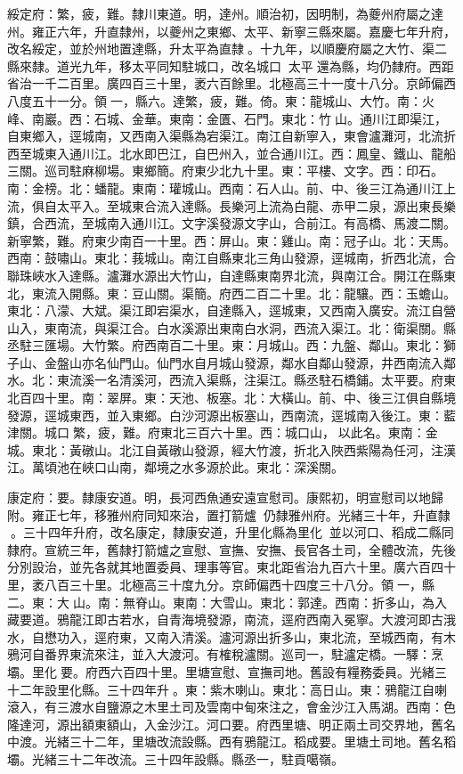 \begin{pinyinscope}
綏定府：繁，疲，難。隸川東道。明，達州。順治初，因明制，為夔州府屬之達州。雍正六年，升直隸州，以夔州之東鄉、太平、新寧三縣來屬。嘉慶七年升府，改名綏定，並於州地置達縣，升太平為直隸。十九年，以順慶府屬之大竹、渠二縣來隸。道光九年，移太平同知駐城口，改名城口，太平還為縣，均仍隸府。西距省治一千二百里。廣四百三十里，袤六百餘里。北極高三十一度十八分。京師偏西八度五十一分。領一，縣六。達繁，疲，難。倚。東：龍城山、大竹。南：火峰、南巖。西：石城、金華。東南：金匱、石門。東北：竹山。通川江即渠江，自東鄉入，逕城南，又西南入渠縣為宕渠江。南江自新寧入，東會瀘灘河，北流折西至城東入通川江。北水即巴江，自巴州入，並合通川江。西：鳳皇、鐵山、龍船三關。巡司駐麻柳場。東鄉簡。府東少北九十里。東：平樓、文字。西：印石。南：金榜。北：蟠龍。東南：瓘城山。西南：石人山。前、中、後三江為通川江上流，俱自太平入。至城東合流入達縣。長樂河上流為白龍、赤甲二泉，源出東長樂鎮，合西流，至城南入通川江。文字溪發源文字山，合前江。有高橋、馬渡二關。新寧繁，難。府東少南百一十里。西：屏山。東：雞山。南：冠子山。北：天馬。西南：鼓嘯山。東北：莪城山。南江自縣東北三角山發源，逕城南，折西北流，合聯珠峽水入達縣。瀘灘水源出大竹山，自達縣東南界北流，與南江合。開江在縣東北，東流入開縣。東：豆山關。渠簡。府西二百二十里。北：龍驤。西：玉蟾山。東北：八濛、大斌。渠江即宕渠水，自達縣入，逕城東，又西南入廣安。流江自營山入，東南流，與渠江合。白水溪源出東南白水洞，西流入渠江。北：衛渠關。縣丞駐三匯場。大竹繁。府西南百二十里。東：月城山。西：九盤、鄰山。東北：獅子山、金盤山亦名仙門山。仙門水自月城山發源，鄰水自鄰山發源，井西南流入鄰水。北：東流溪一名清溪河，西流入渠縣，注渠江。縣丞駐石橋鋪。太平要。府東北百四十里。南：翠屏。東：天池、板塞。北：大橫山。前、中、後三江俱自縣境發源，逕城東西，並入東鄉。白沙河源出板塞山，西南流，逕城南入後江。東：藍津關。城口繁，疲，難。府東北三百六十里。西：城口山，以此名。東南：金城。東北：黃礅山。北江自黃礅山發源，經大竹渡，折北入陜西紫陽為任河，注漢江。萬頃池在峽口山南，鄰境之水多源於此。東北：深溪關。

康定府：要。隸康安道。明，長河西魚通安遠宣慰司。康熙初，明宣慰司以地歸附。雍正七年，移雅州府同知來治，置打箭爐，仍隸雅州府。光緒三十年，升直隸。三十四年升府，改名康定，隸康安道，升里化縣為里化，並以河口、稻成二縣同隸府。宣統三年，舊隸打箭爐之宣慰、宣撫、安撫、長官各土司，全體改流，先後分別設治，並先各就其地置委員、理事等官。東北距省治九百六十里。廣六百四十里，袤八百三十里。北極高三十度九分。京師偏西十四度三十八分。領一，縣二。東：大山。南：無脊山。東南：大雪山。東北：郭達。西南：折多山，為入藏要道。鴉龍江即古若水，自青海境發源，南流，逕府西南入冕寧。大渡河即古涐水，自懋功入，逕府東，又南入清溪。瀘河源出折多山，東北流，至城西南，有木鴉河自番界東流來注，並入大渡河。有榷稅瀘關。巡司一，駐瀘定橋。一驛：烹壩。里化要。府西六百四十里。里塘宣慰、宣撫司地。舊設有糧務委員。光緒三十二年設里化縣。三十四年升。東：紫木喇山。東北：高日山。東：鴉龍江自喇滾入，有三渡水自鹽源之木里土司及雲南中甸來注之，會金沙江入馬湖。西南：色隆達河，源出額東額山，入金沙江。河口要。府西里塘、明正兩土司交界地，舊名中渡。光緒三十二年，里塘改流設縣。西有鴉龍江。稻成要。里塘土司地。舊名稻壩。光緒三十二年改流。三十四年設縣。縣丞一，駐貢噶嶺。


\end{pinyinscope}
